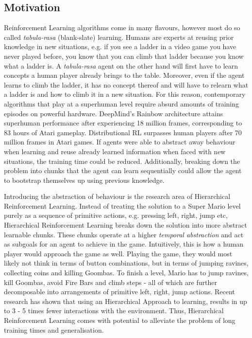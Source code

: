 \documentclass[notitlepage,a4paper,11pt]{article}
\begin{document}
\subsection{Motivation}
Reinforcement Learning algorithms come in many flavours, however most do so called \textit{tabula-rasa} (blank-slate) learning. Humans are experts at reusing prior knowledge in new situations, e.g. if you see a ladder in a video game you have never played before, you know that you can climb that ladder because you know what a ladder is. A \textit{tabula-rasa} agent on the other hand will first have to learn concepts a human player already brings to the table. Moreover, even if the agent learns to climb the ladder, it has no concept thereof and will have to relearn what a ladder is and how to climb it in a new situation. For this reason, contemporary algorithms that play at a superhuman level require absurd amounts of training episodes on powerful hardware. DeepMind's Rainbow architecture \cite{hessel2018rainbow} attains superhuman performance after experiencing 18 million frames, corresponding to 83 hours of Atari gameplay. Distributional RL \cite{bellemare2017distributional} surpasses human players after 70 million frames in Atari games. If agents were able to abstract away behaviour when learning and reuse already learned information when faced with new situations, the training time could be reduced. Additionally, breaking down the problem into chunks that the agent can learn sequentially could allow the agent to bootstrap themselves up using previous knowledge.

Introducing the abstraction of behaviour is the research area of Hierarchical Reinforcement Learning. Instead of treating the solution to a Super Mario level purely as a sequence of primitive actions, e.g. pressing left, right, jump etc, Hierarchical Reinforcement Learning breaks down the solution into more abstract learnable chunks. These chunks operate at a higher \textit{temporal abstraction} and act as subgoals for an agent to achieve in the game. Intuitively, this is how a human player would approach the game as well. Playing the game, they would most likely not think in terms of button combinations, but in terms of jumping ravines, collecting coins and killing Goombas. To finish a level, Mario has to jump ravines, kill Goombas, avoid Fire Bars and climb steps - all of which are further decomposable into arrangements of primitive left, right, jump actions. Recent research \cite{nachum2019does} has shown that using an Hierarchical Approach to learning, results in up to 3 - 5 times fewer interactions with the environment. Thus, Hierarchical Reinforcement Learning comes with potential to alleviate the problem of long training times and generalisation. 
\end{document}
